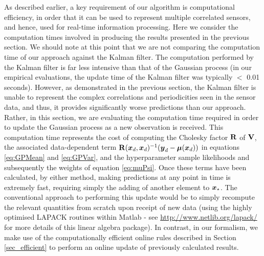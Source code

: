 \documentclass{acmtrans2m}
\begin{document}
\noindent As described earlier, a key requirement of our algorithm is computational efficiency, in order that it can be used to represent multiple correlated sensors, and hence, used for real-time information processing. Here we consider the computation times involved in producing the results presented in the previous section. We should note at this point that we are not comparing the computation time of our approach against the Kalman filter. The computation performed by the Kalman filter is far less intensive than that of the Gaussian process (in our empirical evaluations, the update time of the Kalman filter was typically $<$ 0.01 seconds). However, as demonstrated in the previous section, the Kalman filter is unable to represent the complex correlations and periodicities seen in the sensor data, and thus, it provides significantly worse predictions than our approach. Rather, in this section, we are evaluating the computation time required in order to update the Gaussian process as a new observation is received. This computation time represents the cost of computing the Cholesky factor $\mathbf{R}$ of $\mathbf{V}$, the associated data-dependent term $\mathbf{R}(\boldsymbol{x}_d,\boldsymbol{x}_d)^{-1}(\boldsymbol{y}_d-\boldsymbol{\mu}(\boldsymbol{x}_d))$ in equations \eqref{eq:GPMean} and \eqref{eq:GPVar}, and the hyperparameter sample likelihoods and subsequently the weights of equation \eqref{eq:muPsi}. Once these terms have been calculated, by either method, making predictions at any point in time is extremely fast, requiring simply the adding of another element to $\boldsymbol{x}_\star$. The conventional approach to performing this update would be to simply recompute the relevant quantities from scratch upon receipt of new data (using the highly optimised LAPACK routines within Matlab - see \url{http://www.netlib.org/lapack/} for more details of this linear algebra package). In contrast, in our formalism, we make use of the computationally efficient online rules described in Section \ref{sec_efficient} to perform an online update of previously calculated results.  
\end{document}
